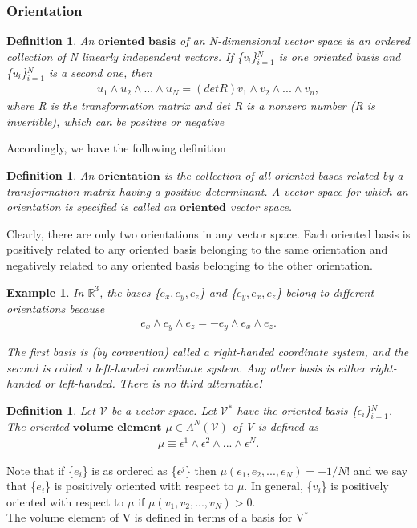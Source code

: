 \documentclass[12pt,a4paper]{article}
\newtheorem{defn}[thm]{Definition}
\newtheorem{exmp}{Example}[section]
\begin{document}
\subsubsection{Orientation}
\begin{defn}
An $\textbf{oriented basis}$ of an N-dimensional vector space is
an ordered collection of N linearly independent vectors.
If \{v$_i$\}$^N_{i=1}$ is one oriented basis and \{u$_i$\}$^N_{i=1}$ is a second one, then\\
\begin{align*}
u_1 \wedge u_2 \wedge ... \wedge u_N = (det R)v_1 \wedge v_2 \wedge ... \wedge v_n,
\end{align*}
where R is the transformation matrix and det R is a nonzero number (R is
invertible), which can be positive or negative
\end{defn}
 \indent Accordingly, we have the following definition
\begin{defn}
An $\textbf{orientation}$ is the collection of all oriented bases related by a transformation matrix having a positive determinant. A vector
space for which an orientation is specified is called an $\textbf{oriented}$ vector space.
\end{defn}
\indent Clearly, there are only two orientations in any vector space. Each oriented
basis is positively related to any oriented basis belonging to the same orientation and negatively related to any oriented basis belonging to the other
orientation. 
 \begin{exmp}
 In $\mathbb{R}^3$,  the bases \{$e_x, e_y, e_z$\} and \{$e_y, e_x, e_z$\} belong
to different orientations because
\begin{align*}
e_x \wedge e_y \wedge e_z = -e_y \wedge e_x \wedge e_z.
\end{align*}

The first basis is (by convention) called a right-handed coordinate system,
and the second is called a left-handed coordinate system. Any other basis
is either right-handed or left-handed. There is no third alternative!
\end{exmp}
\begin{defn}
Let $\mathcal{V}$ be a vector space. Let $\mathcal{V}$$^{*}$ have the oriented basis \{$\epsilon_i$\}$^N_{i=1}$. The oriented $\textbf{volume element}$ $\mu \in \Lambda^{N}(\mathcal{V})$ of V is defined as
\begin{align*}
\mu \equiv \epsilon^1 \wedge \epsilon^2 \wedge ... \wedge \epsilon^N.
\end{align*}
\end{defn}
\indent Note that if \{$e_i$\} is as ordered as \{$\epsilon^j$\} then $\mu( e_1, e_2, ... , e_N) = +1/N!$ and we say that \{$e_i$\} is positively oriented with respect to $\mu$. In general, \{$v_i$\}  is
positively oriented with respect to $\mu$ if $\mu(v_1, v_2, ... , v_N) > 0$. \\ The volume element of V is defined in terms of a basis for V$^*$
\end{document}
